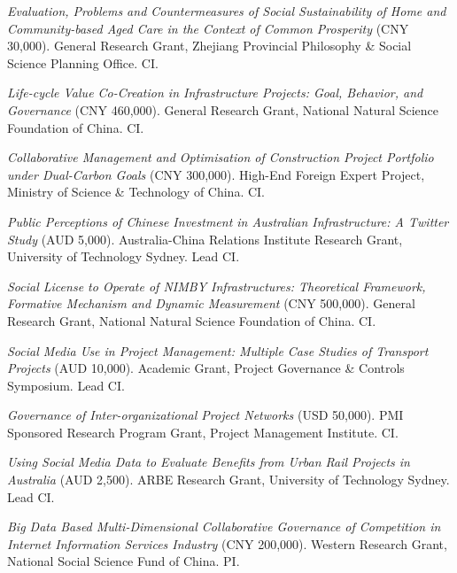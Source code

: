 \documentclass[11pt,a4paper]{report} %
\begin{document}
\begin{tablist}
        \item[2023--26] \tab{}\textit{Evaluation, Problems and Countermeasures of Social Sustainability of Home and Community-based Aged Care in the Context of Common Prosperity} (CNY 30,000). General Research Grant, Zhejiang Provincial Philosophy \& Social Science Planning Office. CI.
        
        \item[2023--26] \tab{}\textit{Life-cycle Value Co-Creation in Infrastructure Projects: Goal, Behavior, and Governance} (CNY 460,000). General Research Grant, National Natural Science Foundation of China. CI.
        
        \item[2022--23] \tab{}\textit{Collaborative Management and Optimisation of Construction Project Portfolio under Dual-Carbon Goals} (CNY 300,000). High-End Foreign Expert Project, Ministry of Science \& Technology of China. CI.
        
        \item[2021--22] \tab{}\textit{Public Perceptions of Chinese Investment in Australian Infrastructure: A Twitter Study} (AUD 5,000). Australia-China Relations Institute Research Grant, University of Technology Sydney. Lead CI.
        
        \item[2021--24] \tab{}\textit{Social License to Operate of NIMBY Infrastructures: Theoretical Framework, Formative Mechanism and Dynamic Measurement} (CNY 500,000). General Research Grant, National Natural Science Foundation of China. CI.
        
        \item[2020--21] \tab{}\textit{Social Media Use in Project Management: Multiple Case Studies of Transport Projects} (AUD 10,000). Academic Grant, Project Governance \& Controls Symposium. Lead CI.
        
        \item[2020--21] \tab{}\textit{Governance of Inter-organizational Project Networks} (USD 50,000). PMI Sponsored Research Program Grant, Project Management Institute. CI.
        
        \item[2019] \tab{}\textit{Using Social Media Data to Evaluate Benefits from Urban Rail Projects in Australia} (AUD 2,500). ARBE Research Grant, University of Technology Sydney. Lead CI.
        
        \item[2019--22] \tab{}\textit{Big Data Based Multi-Dimensional Collaborative Governance of Competition in Internet Information Services Industry} (CNY 200,000). Western Research Grant, National Social Science Fund of China. PI.
        

\end{tablist}
\end{document}
